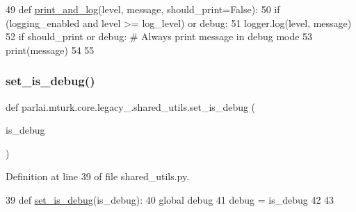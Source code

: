\begin{DoxyCode}
49 \textcolor{keyword}{def }\hyperlink{namespaceparlai_1_1mturk_1_1core_1_1shared__utils_a9ffb0cdb3846323e276281cbeb16979a}{print\_and\_log}(level, message, should\_print=False):
50     \textcolor{keywordflow}{if} (logging\_enabled \textcolor{keywordflow}{and} level >= log\_level) \textcolor{keywordflow}{or} debug:
51         logger.log(level, message)
52     \textcolor{keywordflow}{if} should\_print \textcolor{keywordflow}{or} debug:  \textcolor{comment}{# Always print message in debug mode}
53         print(message)
54 
55 
\end{DoxyCode}
\mbox{\label{namespaceparlai_1_1mturk_1_1core_1_1legacy__2018_1_1shared__utils_afc61e4ad16a272bb8a3e51233596ca6e}} 
\subsubsection{\texorpdfstring{set\+\_\+is\+\_\+debug()}{set\_is\_debug()}}
{\footnotesize\ttfamily def parlai.\+mturk.\+core.\+legacy\+\_.\+shared\+\_\+utils.\+set\+\_\+is\+\_\+debug (\begin{DoxyParamCaption}\item[{}]{is\+\_\+debug }\end{DoxyParamCaption})}



Definition at line 39 of file shared\+\_\+utils.\+py.


\begin{DoxyCode}
39 \textcolor{keyword}{def }\hyperlink{namespaceparlai_1_1mturk_1_1core_1_1shared__utils_a8446a65c83fee3ccdfb7484ff5f3eedd}{set\_is\_debug}(is\_debug):
40     \textcolor{keyword}{global} debug
41     debug = is\_debug
42 
43 
\end{DoxyCode}
\mbox{\label{namespaceparlai_1_1mturk_1_1core_1_1legacy__2018_1_1shared__utils_ac147fdfdeccdb0f0dbfb7528619c41c3}} 
